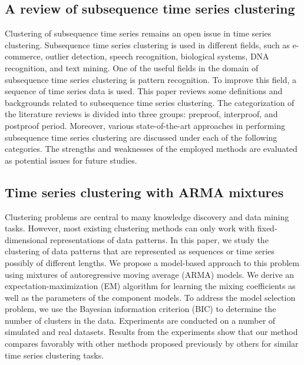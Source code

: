 \documentclass{llncs}
\begin{document}
\subsection{A review of subsequence time series clustering\cite{zolhavarieh2014review}}
Clustering of subsequence time series remains an open issue in time series clustering. Subsequence time series clustering is used in different fields, such as e-commerce, outlier detection, speech recognition, biological systems, DNA recognition, and text mining. One of the useful fields in the domain of subsequence time series clustering is pattern recognition. To improve this field, a sequence of time series data is used. This paper reviews some definitions and backgrounds related to subsequence time series clustering. The categorization of the literature reviews is divided into three groups: preproof, interproof, and postproof period. Moreover, various state-of-the-art approaches in performing subsequence time series clustering are discussed under each of the following categories. The strengths and weaknesses of the employed methods are evaluated as potential issues for future studies.

\subsection{Time series clustering with ARMA mixtures\cite{xiong2004time}}
Clustering problems are central to many knowledge discovery and data mining tasks. However, most existing clustering methods can only work with fixed-dimensional representations of data patterns. In this paper, we study the clustering of data patterns that are represented as sequences or time series possibly of different lengths. We propose a model-based approach to this problem using mixtures of autoregressive moving average (ARMA) models. We derive an expectation-maximization (EM) algorithm for learning the mixing coefficients as well as the parameters of the component models. To address the model selection problem, we use the Bayesian information criterion (BIC) to determine the number of clusters in the data. Experiments are conducted on a number of simulated and real datasets. Results from the experiments show that our method compares favorably with other methods proposed previously by others for similar time series clustering tasks.
\end{document}

